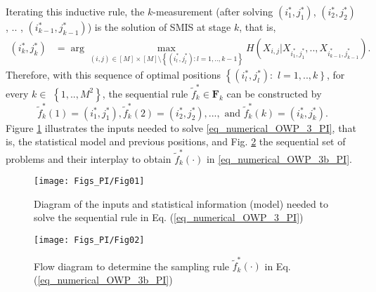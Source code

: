 Iterating this inductive rule, the $k$-measurement (after solving $(i^*_1,j^*_1)$, $(i^*_2,j^*_2)$ , $..$ ,  $(i^*_{k-1},j^*_{k-1})$) is the solution of SMIS at stage $k$, that is,
\begin{align}\label{eq_numerical_OWP_3_PI}
	(i^*_k,j^*_k) 	&= 
				\arg \max_{(i,j)\in [M]\times [M] \setminus \left\{(i^*_l,j^*_l): l=1,..,k-1\right\}} H(X_{i,j}|X_{i^*_1,j^*_1},..,X_{i^*_{k-1},j^*_{k-1}}).
\end{align}
Therefore, with this sequence of optimal positions $\left\{(i^*_l,j^*_l): \right.$ $\left. l=1,..,k \right\}$, for every $k\in $ $\left\{1,..,M^2 \right\}$, the sequential rule $\tilde{f}^*_k \in \mathbf{F}_k$ can be constructed by
\begin{equation}\label{eq_numerical_OWP_3b_PI}
\tilde{f}^*_k(1)=(i^*_1,j^*_1), \tilde{f}^*_k(2)=(i^*_2,j^*_2),..., \text{ and }\tilde{f}^*_k(k)=(i^*_k,j^*_k).
\end{equation}
{ Figure \ref{fig:diagSeq_1_PI} illustrates the inputs needed to solve \eqref{eq_numerical_OWP_3_PI}, {that is}, the statistical model and previous positions, and Fig. \ref{fig:diagSeq_2_PI} the sequential set of problems and their interplay to obtain $\tilde{f}^*_k(\cdot)$ in \eqref{eq_numerical_OWP_3b_PI}.
}

\begin{figure}[!ht]
    \centering
    \texttt{[image: Figs\_PI/Fig01]}
	\caption[Diagram of the inputs and the required statistical model]{\label{fig:diagSeq_1_PI} { Diagram of the inputs and statistical information (model) needed to solve the sequential rule in Eq. (\ref{eq_numerical_OWP_3_PI}) } }
\end{figure}

\begin{figure}[!ht]
    \centering
    \texttt{[image: Figs\_PI/Fig02]}
	\caption[Flow diagram to determine the sampling rule $\tilde{f}^*_k(\cdot)$]{\label{fig:diagSeq_2_PI} Flow diagram to determine the sampling rule $\tilde{f}^*_k(\cdot)$ in Eq. (\ref{eq_numerical_OWP_3b_PI})}
\end{figure}

